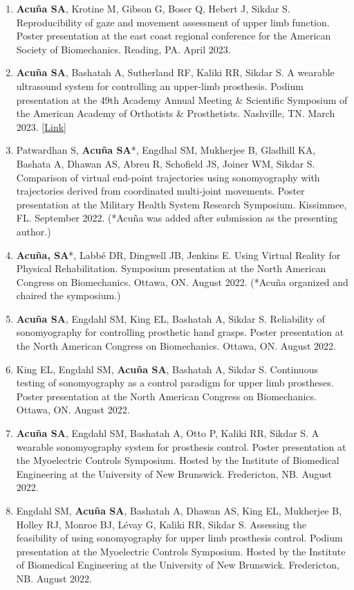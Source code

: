 \documentclass[letterpaper, 10pt]{article}
\begin{document}
\begin{enumerate}
     \item \textbf{Acuña SA}, Krotine M, Gibson G, Boser Q, Hebert J, Sikdar S. Reproducibility of gaze and movement assessment of upper limb function. Poster presentation at the east coast regional conference for the American Society of Biomechanics. Reading, PA. April 2023.
    \item \textbf{Acuña SA}, Bashatah A, Sutherland RF, Kaliki RR, Sikdar S. A wearable ultrasound system for controlling an upper-limb prosthesis. Podium presentation at the 49th Academy Annual Meeting \& Scientiﬁc Symposium of the American Academy of Orthotists \& Prosthetists. Nashville, TN. March 2023. [\href{https://journals.lww.com/jpojournal/Citation/2023/04001/UPPER_LIMB_PROSTHESES.10.aspx}{Link}]
    \item Patwardhan S, \textbf{Acuña SA}*, Engdhal SM, Mukherjee B, Gladhill KA, Bashata A, Dhawan AS, Abreu R, Schofield JS, Joiner WM,  Sikdar S. Comparison of virtual end-point trajectories using sonomyography with trajectories derived from coordinated multi-joint movements. Poster presentation at the Military Health System Research Symposium. Kissimmee, FL. September 2022. (*Acuña was added after submission as the presenting author.)
    \item \textbf{Acuña, SA}*, Labbé DR, Dingwell JB, Jenkins E. Using Virtual Reality for Physical Rehabilitation. Symposium presentation at the North American Congress on Biomechanics. Ottawa, ON. August 2022. (*Acuña organized and chaired the symposium.)
    \item \textbf{Acuña SA}, Engdahl SM, King EL, Bashatah A, Sikdar S. Reliability of sonomyography for controlling prosthetic hand grasps. Poster presentation at the North American Congress on Biomechanics. Ottawa, ON. August 2022.
    \item King EL, Engdahl SM, \textbf{Acuña SA}, Bashatah A, Sikdar S. Continuous testing of sonomyography as a control paradigm for upper limb prostheses. Poster presentation at the North American Congress on Biomechanics. Ottawa, ON. August 2022.
    \item \textbf{Acuña SA}, Engdahl SM, Bashatah A, Otto P, Kaliki RR, Sikdar S. A wearable sonomyography system for prosthesis control. Poster presentation at the Myoelectric Controls Symposium. Hosted by the Institute of Biomedical Engineering at the University of New Brunswick. Fredericton, NB. August 2022.
    \item Engdahl SM, \textbf{Acuña SA}, Bashatah A, Dhawan AS, King EL, Mukherjee B, Holley RJ, Monroe BJ, Lévay G, Kaliki RR, Sikdar S. Assessing the feasibility of using sonomyography for upper limb prosthesis control. Podium presentation at the Myoelectric Controls Symposium. Hosted by the Institute of Biomedical Engineering at the University of New Brunswick. Fredericton, NB. August 2022.

\end{enumerate}
\end{document}
